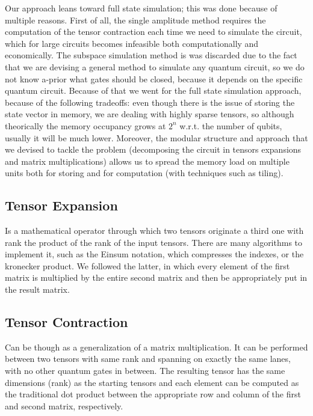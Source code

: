 \documentclass[12pt,oneside,a4paper]{article}
\begin{document}
Our approach leans toward full state simulation; this was done because of multiple reasons. First of all, the single amplitude method requires the computation of the tensor contraction each time we need to simulate the circuit, which for large circuits becomes infeasible both computationally and economically. The subspace simulation method is was discarded due to the fact that we are devising a general method to simulate any quantum circuit, so we do not know a-prior what gates should be closed, because it depends on the specific quantum circuit. Because of that we went for the full state simulation approach, because of the following tradeoffs: even though there is the issue of storing the state vector in memory, we are dealing with highly sparse tensors, so although theorically the memory occupancy grows at $2^n$ w.r.t. the number of qubits, usually it will be much lower. Moreover, the modular structure and approach that we devised to tackle the problem (decomposing the circuit in tensors expansions and matrix multiplications) allows us to spread the memory load on multiple units both for storing and for computation (with techniques such as tiling).

\subsection{Tensor Expansion}
Is a mathematical operator through which two tensors originate a third one with rank the product of the rank of the input tensors. There are many algorithms to implement it, such as the Einsum notation, which compresses the indexes, or the kronecker product. We followed the latter, in which every element of the first matrix is multiplied by the entire second matrix and then be appropriately put in the result matrix.

\subsection{Tensor Contraction}
Can be though as a generalization of a matrix multiplication. It can be performed between two tensors with same rank and spanning on exactly the same lanes, with no other quantum gates in between. The resulting tensor has the same dimensions (rank) as the starting tensors and each element can be computed as the traditional dot product between the appropriate row and column of the first and second matrix, respectively.
\end{document}
